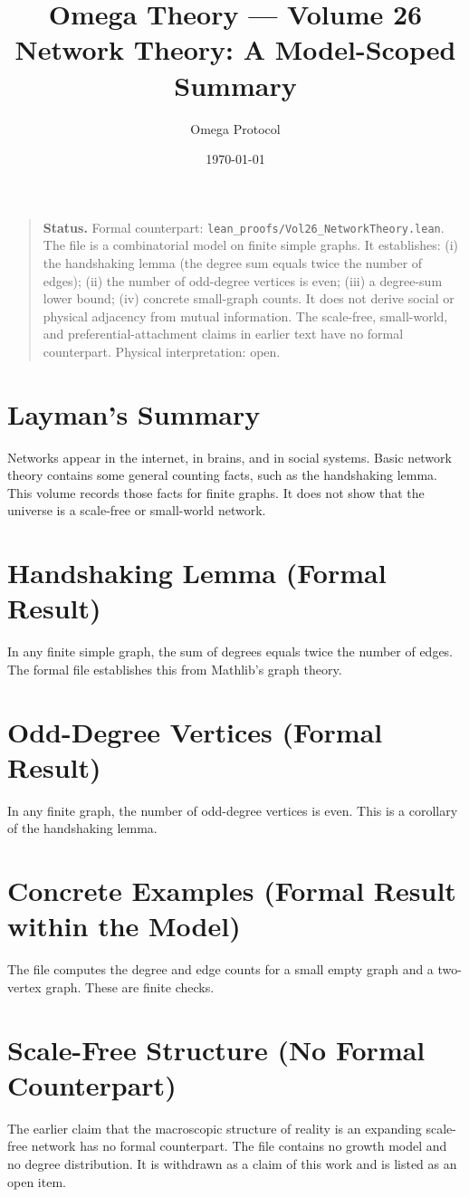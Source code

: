 \documentclass[11pt, a4paper]{article}
\title{Omega Theory --- Volume 26\\\Large Network Theory: A Model-Scoped Summary}
\author{Omega Protocol}
\date{\today}
\begin{document}
\maketitle

\begin{quote}
\textbf{Status.} Formal counterpart: \texttt{lean\_proofs/Vol26\_NetworkTheory.lean}. The file is a combinatorial model on finite simple graphs. It establishes: (i) the handshaking lemma (the degree sum equals twice the number of edges); (ii) the number of odd-degree vertices is even; (iii) a degree-sum lower bound; (iv) concrete small-graph counts. It does not derive social or physical adjacency from mutual information. The scale-free, small-world, and preferential-attachment claims in earlier text have no formal counterpart. Physical interpretation: open.
\end{quote}

\section*{Layman's Summary}
Networks appear in the internet, in brains, and in social systems. Basic network theory contains some general counting facts, such as the handshaking lemma. This volume records those facts for finite graphs. It does not show that the universe is a scale-free or small-world network.

\section{Handshaking Lemma (Formal Result)}
In any finite simple graph, the sum of degrees equals twice the number of edges. The formal file establishes this from Mathlib's graph theory.

\section{Odd-Degree Vertices (Formal Result)}
In any finite graph, the number of odd-degree vertices is even. This is a corollary of the handshaking lemma.

\section{Concrete Examples (Formal Result within the Model)}
The file computes the degree and edge counts for a small empty graph and a two-vertex graph. These are finite checks.

\section{Scale-Free Structure (No Formal Counterpart)}
The earlier claim that the macroscopic structure of reality is an expanding scale-free network has no formal counterpart. The file contains no growth model and no degree distribution. It is withdrawn as a claim of this work and is listed as an open item.
\end{document}
